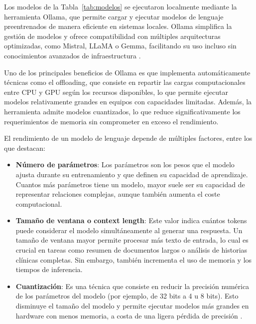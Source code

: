 \documentclass[../main.tex]{subfiles}
\begin{document}
Los modelos de la Tabla~\ref{tab:modelos} se ejecutaron localmente mediante la herramienta Ollama, que permite cargar y ejecutar modelos de lenguaje preentrenados de manera eficiente en sistemas locales. Ollama simplifica la gestión de modelos y ofrece compatibilidad con múltiples arquitecturas optimizadas, como Mistral, LLaMA o Gemma, facilitando su uso incluso sin conocimientos avanzados de infraestructura \parencite{ollama2023}.

Uno de los principales beneficios de Ollama es que implementa automáticamente técnicas como el offloading, que consiste en repartir las cargas computacionales entre CPU y GPU según los recursos disponibles, lo que permite ejecutar modelos relativamente grandes en equipos con capacidades limitadas. Además, la herramienta admite modelos cuantizados, lo que reduce significativamente los requerimientos de memoria sin comprometer en exceso el rendimiento.

El rendimiento de un modelo de lenguaje depende de múltiples factores, entre los que destacan:

\begin{itemize}
	\item \textbf{Número de parámetros}: Los parámetros son los pesos que el modelo ajusta durante su entrenamiento y que definen su capacidad de aprendizaje. Cuantos más parámetros tiene un modelo, mayor suele ser su capacidad de representar relaciones complejas, aunque también aumenta el coste computacional.
	
	\item \textbf{Tamaño de ventana o context length}: Este valor indica cuántos tokens puede considerar el modelo simultáneamente al generar una respuesta. Un tamaño de ventana mayor permite procesar más texto de entrada, lo cual es crucial en tareas como resumen de documentos largos o análisis de historias clínicas completas. Sin embargo, también incrementa el uso de memoria y los tiempos de inferencia.
	
	\item \textbf{Cuantización}: Es una técnica que consiste en reducir la precisión numérica de los parámetros del modelo (por ejemplo, de 32 bits a 4 u 8 bits). Esto disminuye el tamaño del modelo y permite ejecutar modelos más grandes en hardware con menos memoria, a costa de una ligera pérdida de precisión \parencite{huggingface_4bit}. 
\end{itemize}
\end{document}
